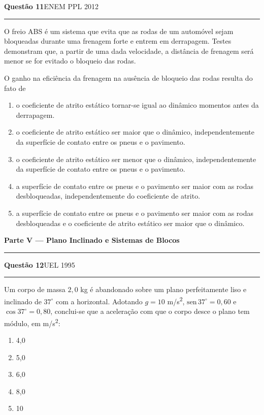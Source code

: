 \documentclass[11pt,a4paper]{article}
\newcommand{\fonte}[1]{{\small\scshape\color{grafite}#1}}
\newenvironment{questao}[2]{%
  \needspace{6\baselineskip}
  \par\addvspace{1.6em}
  {\large\bfseries\color{vinho}Quest\~ao #1}\hfill #2\\[-0.55em]
  {\color{black!25}\rule{\linewidth}{0.4pt}}
  \par\nobreak\smallskip
}{\par\addvspace{0.4em}}
\newcommand{\parte}[1]{%
  \needspace{7\baselineskip}
  \vspace{1.8em}
  {\Large\bfseries #1}\\[-0.55em]
  {\color{black!30}\rule{\linewidth}{0.5pt}}
  \par\nobreak\smallskip
}
\begin{document}
\begin{questao}{11}{\fonte{ENEM PPL 2012}}
O freio ABS \'e um sistema que evita que as rodas de um autom\'ovel
sejam bloqueadas durante uma frenagem forte e entrem em derrapagem.
Testes demonstram que, a partir de uma dada velocidade, a dist\^ancia de
frenagem ser\'a menor se for evitado o bloqueio das rodas.

O ganho na efici\^encia da frenagem na aus\^encia de bloqueio das rodas
resulta do fato de
\begin{enumerate}
  \item o coeficiente de atrito est\'atico tornar-se igual ao din\^amico
        momentos antes da derrapagem.
  \item o coeficiente de atrito est\'atico ser maior que o din\^amico,
        independentemente da superf\'icie de contato entre os pneus e o
        pavimento.
  \item o coeficiente de atrito est\'atico ser menor que o din\^amico,
        independentemente da superf\'icie de contato entre os pneus e o
        pavimento.
  \item a superf\'icie de contato entre os pneus e o pavimento ser maior
        com as rodas desbloqueadas, independentemente do coeficiente de
        atrito.
  \item a superf\'icie de contato entre os pneus e o pavimento ser maior
        com as rodas desbloqueadas e o coeficiente de atrito est\'atico
        ser maior que o din\^amico.
\end{enumerate}
\end{questao}

\parte{Parte V --- Plano Inclinado e Sistemas de Blocos}

\begin{questao}{12}{\fonte{UEL 1995}}
Um corpo de massa $2{,}0$ kg \'e abandonado sobre um plano
perfeitamente liso e inclinado de $37^{\circ}$ com a horizontal.
Adotando $g = 10$ m/s\textsuperscript{2},
$\mathrm{sen}\,37^{\circ} = 0{,}60$ e $\cos 37^{\circ} = 0{,}80$,
conclui-se que a acelera\c{c}\~ao com que o corpo desce o plano tem
m\'odulo, em m/s\textsuperscript{2}:
\begin{enumerate}
  \item 4,0
  \item 5,0
  \item 6,0
  \item 8,0
  \item 10
\end{enumerate}
\end{questao}
\end{document}
